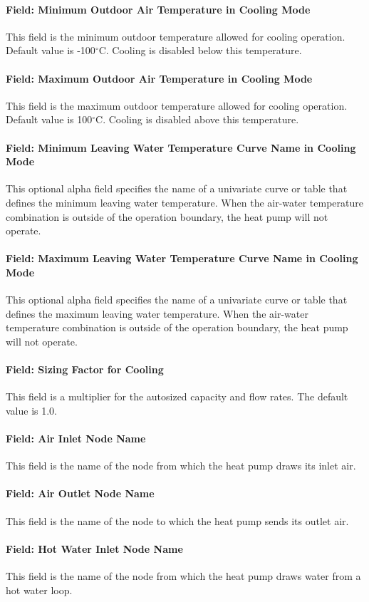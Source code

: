 \paragraph{Field: Minimum Outdoor Air Temperature in Cooling Mode} This field is
the minimum outdoor temperature allowed for cooling operation. Default value is
-100$^\circ$C. Cooling is disabled below this temperature.
\paragraph{Field: Maximum Outdoor Air Temperature in Cooling Mode} This field is
the maximum outdoor temperature allowed for cooling operation. Default value is
100$^\circ$C. Cooling is disabled above this temperature.
\paragraph{Field: Minimum Leaving Water Temperature Curve Name in Cooling Mode}
This optional alpha field specifies the name of a univariate curve or table that defines
the minimum leaving water temperature. When the air-water temperature combination is outside of
the operation boundary, the heat pump will not operate.
\paragraph{Field: Maximum Leaving Water Temperature Curve Name in Cooling Mode}
This optional alpha field specifies the name of a univariate curve or table that defines
the maximum leaving water temperature. When the air-water temperature combination is outside of
the operation boundary, the heat pump will not operate.
\paragraph{Field: Sizing Factor for Cooling} This field is a multiplier for the
autosized capacity and flow rates. The default value is 1.0.
\paragraph{Field: Air Inlet Node Name} This field is the name of the node from
which the heat pump draws its inlet air.
\paragraph{Field: Air Outlet Node Name} This field is the name of the node to
which the heat pump sends its outlet air.
\paragraph{Field: Hot Water Inlet Node Name} This field is the name of the node
from which the heat pump draws water from a hot water loop.
